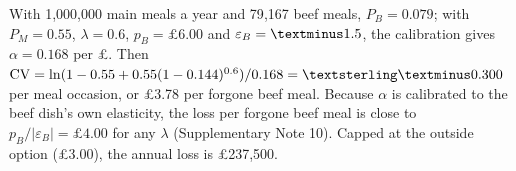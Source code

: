With 1{,}000{,}000 main meals a year and 79{,}167 beef meals, $P_B = 0.079$; with $P_M=0.55$, $\lambda=0.6$, $p_B=£6.00$ and $\varepsilon_B=\textminus 1.5$, the calibration gives $\alpha=0.168$ per £. Then $\mathrm{CV} = \ln(1-0.55+0.55(1-0.144)^{0.6})/0.168 = £\textminus 0.300$ per meal occasion, or £3.78 per forgone beef meal. Because $\alpha$ is calibrated to the beef dish's own elasticity, the loss per forgone beef meal is close to $p_B/|\varepsilon_B| = £4.00$ for any $\lambda$ (Supplementary Note 10). Capped at the outside option (£3.00), the annual loss is £237{,}500.

